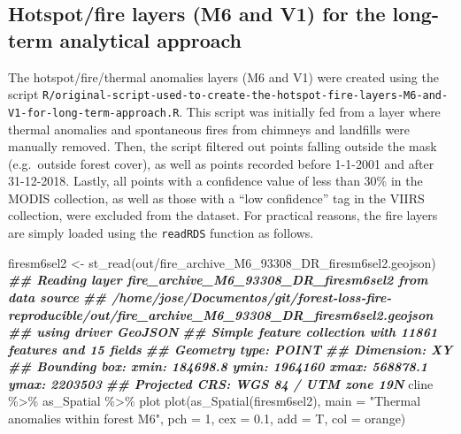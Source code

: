 \documentclass[10pt,landscape,a3paper]{article}
\newenvironment{Shaded}{\begin{snugshade}}{\end{snugshade}}
\newcommand{\AttributeTok}[1]{\textcolor[rgb]{0.77,0.63,0.00}{#1}}
\newcommand{\DecValTok}[1]{\textcolor[rgb]{0.00,0.00,0.81}{#1}}
\newcommand{\DocumentationTok}[1]{\textcolor[rgb]{0.56,0.35,0.01}{\textbf{\textit{#1}}}}
\newcommand{\FloatTok}[1]{\textcolor[rgb]{0.00,0.00,0.81}{#1}}
\newcommand{\FunctionTok}[1]{\textcolor[rgb]{0.00,0.00,0.00}{#1}}
\newcommand{\NormalTok}[1]{#1}
\newcommand{\OtherTok}[1]{\textcolor[rgb]{0.56,0.35,0.01}{#1}}
\newcommand{\SpecialCharTok}[1]{\textcolor[rgb]{0.00,0.00,0.00}{#1}}
\newcommand{\StringTok}[1]{\textcolor[rgb]{0.31,0.60,0.02}{#1}}
\begin{document}
\hypertarget{hotspotfire-layers-m6-and-v1-for-the-long-term-analytical-approach}{%
\subsection{Hotspot/fire layers (M6 and V1) for the long-term analytical
approach}\label{hotspotfire-layers-m6-and-v1-for-the-long-term-analytical-approach}}

The hotspot/fire/thermal anomalies layers (M6 and V1) were created using
the script
\texttt{R/original-script-used-to-create-the-hotspot-fire-layers-M6-and-V1-for-long-term-approach.R}.
This script was initially fed from a layer where thermal anomalies and
spontaneous fires from chimneys and landfills were manually removed.
Then, the script filtered out points falling outside the mask
(e.g.~outside forest cover), as well as points recorded before 1-1-2001
and after 31-12-2018. Lastly, all points with a confidence value of less
than 30\% in the MODIS collection, as well as those with a ``low
confidence'' tag in the VIIRS collection, were excluded from the
dataset. For practical reasons, the fire layers are simply loaded using
the \texttt{readRDS} function as follows.

\begin{Shaded}
\begin{Highlighting}[]
\NormalTok{firesm6sel2 }\OtherTok{\textless{}{-}} \FunctionTok{st\_read}\NormalTok{(}\StringTok{\textquotesingle{}out/fire\_archive\_M6\_93308\_DR\_firesm6sel2.geojson\textquotesingle{}}\NormalTok{)}
\DocumentationTok{\#\# Reading layer \textasciigrave{}fire\_archive\_M6\_93308\_DR\_firesm6sel2\textquotesingle{} from data source }
\DocumentationTok{\#\#   \textasciigrave{}/home/jose/Documentos/git/forest{-}loss{-}fire{-}reproducible/out/fire\_archive\_M6\_93308\_DR\_firesm6sel2.geojson\textquotesingle{} }
\DocumentationTok{\#\#   using driver \textasciigrave{}GeoJSON\textquotesingle{}}
\DocumentationTok{\#\# Simple feature collection with 11861 features and 15 fields}
\DocumentationTok{\#\# Geometry type: POINT}
\DocumentationTok{\#\# Dimension:     XY}
\DocumentationTok{\#\# Bounding box:  xmin: 184698.8 ymin: 1964160 xmax: 568878.1 ymax: 2203503}
\DocumentationTok{\#\# Projected CRS: WGS 84 / UTM zone 19N}
\NormalTok{cline }\SpecialCharTok{\%\textgreater{}\%}\NormalTok{ as\_Spatial }\SpecialCharTok{\%\textgreater{}\%}\NormalTok{ plot}
\FunctionTok{plot}\NormalTok{(}\FunctionTok{as\_Spatial}\NormalTok{(firesm6sel2), }\AttributeTok{main =} \StringTok{"Thermal anomalies within forest M6"}\NormalTok{,}
     \AttributeTok{pch =} \DecValTok{1}\NormalTok{, }\AttributeTok{cex =} \FloatTok{0.1}\NormalTok{, }\AttributeTok{add =}\NormalTok{ T, }\AttributeTok{col =} \StringTok{\textquotesingle{}orange\textquotesingle{}}\NormalTok{)}
\end{Highlighting}
\end{Shaded}
\end{document}
